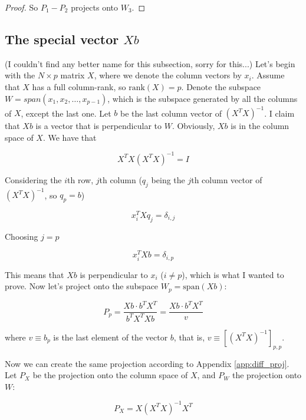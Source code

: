 \documentclass{article}
\begin{document}
\begin{appendices}
\begin{proof}
So $P_1 - P_2$ projects onto $W_3$.

\end{proof}

\subsection{The special vector $Xb$} \label{app:spec_Xb}

(I couldn't find any better name for this subsection, sorry for this...) Let's begin with the $N\times p$ matrix $X$, where we denote the column vectors by $x_i$. Assume that $X$ has a full column-rank, so $\text{rank}(X)=p$. Denote the subspace $W = span(x_1, x_2, \dots, x_{p-1})$, which is the subspace generated by all the columns of $X$, except the last one. Let $b$ be the last column vector of $(X^TX)^{-1}$. I claim that $Xb$ is a vector that is perpendicular to $W$. Obviously, $Xb$ is in the column space of $X$. We have that

\begin{equation}
    X^TX(X^TX)^{-1} = I
\end{equation}

Considering the $i$th row, $j$th column ($q_j$ being the $j$th column vector of $(X^TX)^{-1}$, so $q_p = b$)

\begin{equation}
    x^T_i X q_j = \delta_{i,j}
\end{equation}

Choosing $j=p$

\begin{equation}
    x^T_i X b = \delta_{i,p}
\end{equation}

This means that $Xb$ is perpendicular to $x_i$ ($i \neq p$), which is what I wanted to prove. Now let's project onto the subspace $W_p = \text{span}(Xb)$:

\begin{equation}
    P_{p} = \frac{Xb\cdot b^TX^T}{b^TX^TXb} = \frac{Xb\cdot b^TX^T}{v}
\end{equation}

where $v \equiv b_p$ is the last element of the vector $b$, that is, $v\equiv [(X^TX)^{-1}]_{p,p}$.

Now we can create the same projection according to Appendix \ref{app:diff_proj}. Let $P_X$ be the projection onto the column space of $X$, and $P_W$ the projection onto $W$:

\begin{equation}
    P_X = X (X^TX)^{-1} X^T
\end{equation}


\end{appendices}
\end{document}
